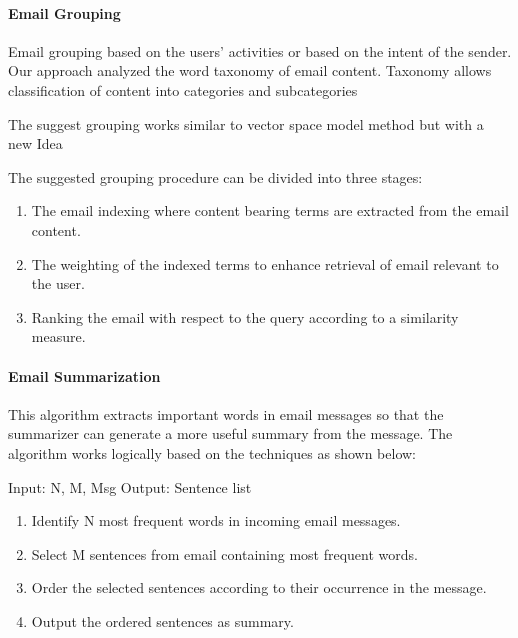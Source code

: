 \documentclass[12pt]{article}
\newenvironment{my_itemize}
{\begin{itemize}
  \setlength{\itemsep}{0cm}
  \setlength{\parskip}{0cm}}
{\end{itemize}}
\begin{document}
\paragraph{Email Grouping}
\begin{my_itemize}
 \item Email grouping based on the users’ activities or based on the intent of the sender. Our approach analyzed the word taxonomy of email content. Taxonomy allows classification of content into categories and subcategories
 \item The suggest grouping works similar to vector space model method but with a new Idea
 \item The suggested grouping procedure can be divided into three stages:
 \begin{enumerate}
  \item The email indexing where content bearing terms are extracted from the email content.
  \item The weighting of the indexed terms to enhance retrieval of email relevant to the user.
  \item Ranking the email with respect to the query according to a similarity measure.
 \end{enumerate}
\end{my_itemize}

\paragraph{Email Summarization}
\begin{my_itemize}
 \item This algorithm extracts important words in email messages so that the summarizer can generate a more useful summary from the message. The algorithm works logically based on the techniques as shown below:
 \begin{my_itemize}
 \item Input: N, M, Msg Output: Sentence list
  \begin{enumerate}
   \item Identify N most frequent words in incoming email messages.
   \item Select M sentences from email containing most frequent words.
   \item Order the selected sentences according to their occurrence in the message.
   \item Output the ordered sentences as summary.
  \end{enumerate}
 \end{my_itemize}
\end{my_itemize}
\end{document}
